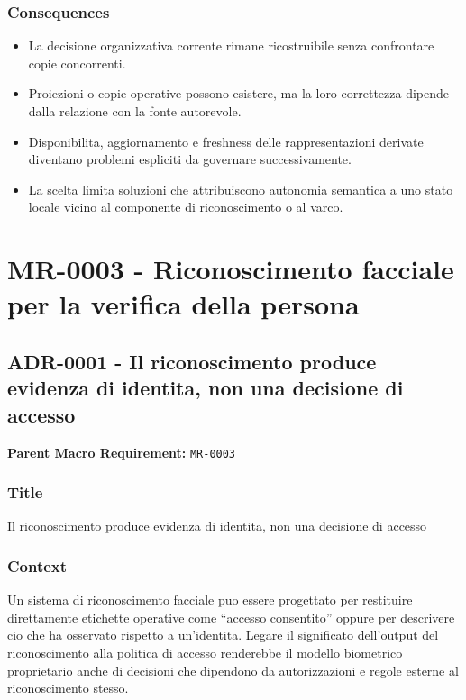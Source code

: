 \documentclass[
  10pt,
]{article}
\providecommand{\tightlist}{%
  \setlength{\itemsep}{0pt}\setlength{\parskip}{0pt}}
\begin{document}
\subsubsection{Consequences}\label{consequences-3}

\begin{itemize}
\tightlist
\item
  La decisione organizzativa corrente rimane ricostruibile senza
  confrontare copie concorrenti.
\item
  Proiezioni o copie operative possono esistere, ma la loro correttezza
  dipende dalla relazione con la fonte autorevole.
\item
  Disponibilita, aggiornamento e freshness delle rappresentazioni
  derivate diventano problemi espliciti da governare successivamente.
\item
  La scelta limita soluzioni che attribuiscono autonomia semantica a uno
  stato locale vicino al componente di riconoscimento o al varco.
\end{itemize}

\section{MR-0003 - Riconoscimento facciale per la verifica della
persona}\label{mr-0003---riconoscimento-facciale-per-la-verifica-della-persona}

\subsection{ADR-0001 - Il riconoscimento produce evidenza di identita,
non una decisione di
accesso}\label{adr-0001---il-riconoscimento-produce-evidenza-di-identita-non-una-decisione-di-accesso}

\textbf{Parent Macro Requirement:} \texttt{MR-0003}

\subsubsection{Title}\label{title-4}

Il riconoscimento produce evidenza di identita, non una decisione di
accesso

\subsubsection{Context}\label{context-4}

Un sistema di riconoscimento facciale puo essere progettato per
restituire direttamente etichette operative come ``accesso consentito''
oppure per descrivere cio che ha osservato rispetto a un'identita.
Legare il significato dell'output del riconoscimento alla politica di
accesso renderebbe il modello biometrico proprietario anche di decisioni
che dipendono da autorizzazioni e regole esterne al riconoscimento
stesso.
\end{document}
